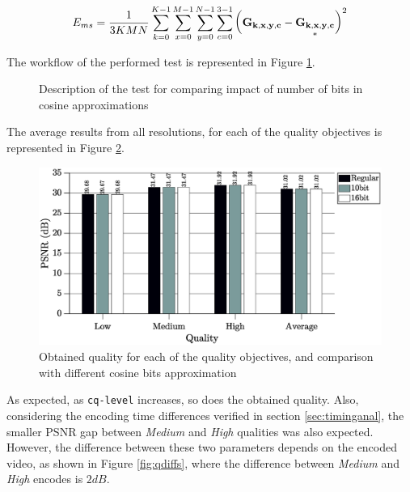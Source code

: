 \begin{equation} \label{eq:emss}
    E_{ms} = \frac{1}{3KMN}\sum^{K-1}_{k=0} \sum^{M-1}_{x=0} \sum^{N-1}_{y=0} \sum_{c=0}^{3-1} \left(\mathbf{G_{k,x,y,c}} - \underset{*}{\mathbf{G_{k,x,y,c}}}\right)^2
\end{equation}

The workflow of the performed test is represented in Figure \ref{fig:compcosbit}.

\begin{figure}[!htbp]
    \centering
    
    \caption{Description of the test for comparing impact of number of bits in cosine approximations}
    \label{fig:compcosbit}
\end{figure}

The average results from all resolutions, for each of the quality objectives is represented in Figure \ref{fig:compcosbitavg}.

\begin{figure}[!htpb]
    \centering
    \includegraphics[width=\textwidth]{Sections/3Transforms/Images/compcosbitAvg.eps}
    \caption{Obtained quality for each of the quality objectives, and comparison with different cosine bits approximation}
    \label{fig:compcosbitavg}
\end{figure}

As expected, as \texttt{cq-level} increases, so does the obtained quality. Also, considering the encoding time differences verified in section \ref{sec:timinganal}, the smaller PSNR gap between \emph{Medium} and \emph{High} qualities was also expected. However, the difference between these two parameters depends on the encoded video, as shown in Figure \ref{fig:qdiffs}, where the difference between \emph{Medium} and \emph{High} encodes is $2 dB$.

